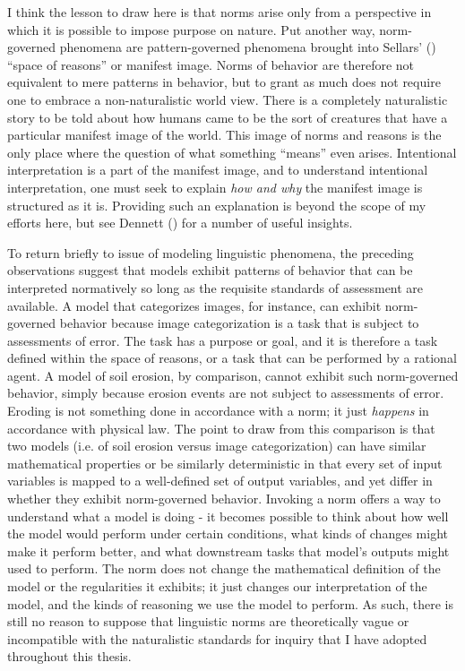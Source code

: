 I think the lesson to draw here is that norms arise only from a perspective in which it is possible to impose purpose on nature. Put another way, norm-governed phenomena are pattern-governed phenomena brought into Sellars' (\citeyear{Sellars:1963}) ``space of reasons'' or manifest image. Norms of behavior are therefore not equivalent to mere patterns in behavior, but to grant as much does not require one to embrace a non-naturalistic world view. There is a completely naturalistic story to be told about how humans came to be the sort of creatures that have a particular manifest image of the world. This image of norms and reasons is the only place where the question of what something ``means'' even arises. Intentional interpretation is a part of the manifest image, and to understand intentional interpretation, one must seek to explain \textit{how and why} the manifest image is structured as it is. Providing such an explanation is beyond the scope of my efforts here, but see Dennett (\citeyear{Dennett:1987,Dennett:2010}) for a number of useful insights.

To return briefly to issue of modeling linguistic phenomena, the preceding observations suggest that models exhibit patterns of behavior that can be interpreted normatively so long as the requisite standards of assessment are available. A model that categorizes images, for instance, can exhibit norm-governed behavior because image categorization is a task that is subject to assessments of error. The task has a purpose or goal, and it is therefore a task defined within the space of reasons, or a task that can be performed by a rational agent. A model of soil erosion, by comparison, cannot exhibit such norm-governed behavior, simply because erosion events are not subject to assessments of error. Eroding is not something done in accordance with a norm; it just \textit{happens} in accordance with physical law. The point to draw from this comparison is that two models (i.e. of soil erosion versus image categorization) can have similar mathematical properties or be similarly deterministic in that every set of input variables is mapped to a well-defined set of output variables, and yet differ in whether they exhibit norm-governed behavior. Invoking a norm offers a way to understand what a model is doing - it becomes possible to think about how well the model would perform under certain conditions, what kinds of changes might make it perform better, and what downstream tasks that model's outputs might used to perform. The norm does not change the mathematical definition of the model or the regularities it exhibits; it just changes our interpretation of the model, and the kinds of reasoning we use the model to perform. As such, there is still no reason to suppose that linguistic norms are theoretically vague or incompatible with the naturalistic standards for inquiry that I have adopted throughout this thesis. 

